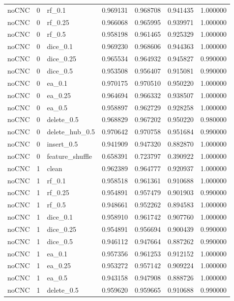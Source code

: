 \documentclass[UTF8,a4paper,11pt,fontset=fandol]{ctexart}
\begin{document}
{\begin{longtable}{lrlrrrr}
noCNC & 0 & rf\_0.1 & 0.969131 & 0.968708 & 0.941435 & 1.000000 \\
noCNC & 0 & rf\_0.25 & 0.966068 & 0.965995 & 0.939971 & 1.000000 \\
noCNC & 0 & rf\_0.5 & 0.958198 & 0.961465 & 0.925329 & 1.000000 \\
noCNC & 0 & dice\_0.1 & 0.969230 & 0.968606 & 0.944363 & 1.000000 \\
noCNC & 0 & dice\_0.25 & 0.965534 & 0.964932 & 0.945827 & 0.990000 \\
noCNC & 0 & dice\_0.5 & 0.953508 & 0.956407 & 0.915081 & 0.990000 \\
noCNC & 0 & ea\_0.1 & 0.970175 & 0.970510 & 0.950220 & 1.000000 \\
noCNC & 0 & ea\_0.25 & 0.964694 & 0.966332 & 0.938507 & 1.000000 \\
noCNC & 0 & ea\_0.5 & 0.958897 & 0.962729 & 0.928258 & 1.000000 \\
noCNC & 0 & delete\_0.5 & 0.968829 & 0.967202 & 0.950220 & 0.980000 \\
noCNC & 0 & delete\_hub\_0.5 & 0.970642 & 0.970758 & 0.951684 & 0.990000 \\
noCNC & 0 & insert\_0.5 & 0.941909 & 0.947320 & 0.882870 & 1.000000 \\
noCNC & 0 & feature\_shuffle & 0.658391 & 0.723797 & 0.390922 & 1.000000 \\
noCNC & 1 & clean & 0.962389 & 0.964777 & 0.920937 & 1.000000 \\
noCNC & 1 & rf\_0.1 & 0.958518 & 0.961361 & 0.910688 & 1.000000 \\
noCNC & 1 & rf\_0.25 & 0.954891 & 0.957479 & 0.901903 & 0.990000 \\
noCNC & 1 & rf\_0.5 & 0.948661 & 0.952262 & 0.894583 & 1.000000 \\
noCNC & 1 & dice\_0.1 & 0.958910 & 0.961742 & 0.907760 & 1.000000 \\
noCNC & 1 & dice\_0.25 & 0.954891 & 0.956694 & 0.900439 & 0.990000 \\
noCNC & 1 & dice\_0.5 & 0.946112 & 0.947664 & 0.887262 & 0.990000 \\
noCNC & 1 & ea\_0.1 & 0.957356 & 0.961253 & 0.912152 & 1.000000 \\
noCNC & 1 & ea\_0.25 & 0.953272 & 0.957142 & 0.909224 & 1.000000 \\
noCNC & 1 & ea\_0.5 & 0.943158 & 0.947908 & 0.888726 & 1.000000 \\
noCNC & 1 & delete\_0.5 & 0.959620 & 0.959665 & 0.910688 & 0.990000 \\

\end{longtable}}
\end{document}
